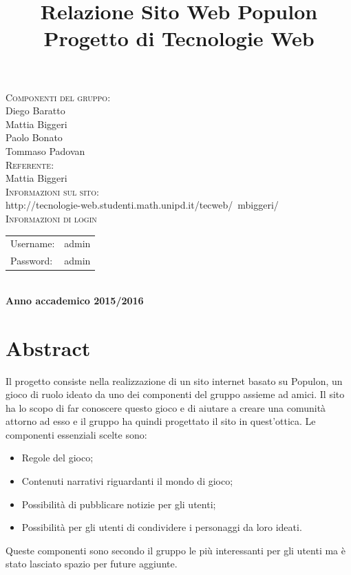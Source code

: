 \documentclass{article}
\title{Relazione Sito Web Populon \\ Progetto di Tecnologie Web} %
\begin{document}
\maketitle %

\begin{center}
\textsc{\LARGE Componenti del gruppo:}\\[0.2cm]
 Diego Baratto \\ %
Mattia Biggeri \\
Paolo Bonato \\
Tommaso Padovan \\[0.2cm]
\textsc{\LARGE Referente:}\\[0.2cm]
 Mattia Biggeri\\[0.2cm]
 \textsc{\LARGE Informazioni sul sito:}\\ [0.2cm]
http://tecnologie-web.studenti.math.unipd.it/tecweb/~mbiggeri/\\[0.2cm]
\textsc{\LARGE Informazioni di login}\\[0.2cm]

\begin{tabular}{l r} 
 Username: & admin\\
 Password: & admin\\
\end{tabular}\\[0.2cm]
\textbf{Anno accademico 2015/2016}
\end{center}

\newpage
\tableofcontents %
\newpage

 \newpage

\section{Abstract}
	Il progetto consiste nella realizzazione di un sito internet basato su Populon, un gioco di ruolo ideato da uno dei
	componenti del gruppo assieme ad amici. Il sito ha lo scopo di far conoscere questo gioco e di aiutare a creare una comunità
	attorno ad esso e il gruppo ha quindi progettato il sito in quest'ottica. Le componenti essenziali scelte sono:
	\begin{itemize}
		\item Regole del gioco;
		\item Contenuti narrativi riguardanti il mondo di gioco;
		\item Possibilità di pubblicare notizie per gli utenti;
		\item Possibilità per gli utenti di condividere i personaggi da loro ideati.	
	\end{itemize}
	Queste componenti sono secondo il gruppo le più interessanti per gli utenti ma è stato lasciato spazio per future aggiunte.
	
\end{document}
